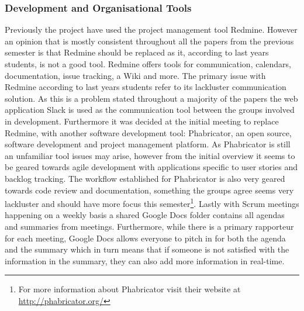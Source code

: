 \subsubsection*{Development and Organisational Tools}
Previously the project have used the project management tool Redmine.
However an opinion that is mostly consistent throughout all the papers from the previous semester is that Redmine should be replaced as it, according to last years students, is not a good tool.
Redmine offers tools for communication, calendars, documentation, issue tracking, a Wiki and more.
The primary issue with Redmine according to last years students refer to its lackluster communication solution.
As this is a problem stated throughout a majority of the papers the web application Slack is used as the communication tool between the groups involved in development.
Furthermore it was decided at the initial meeting to replace Redmine, with another software development tool: Phabricator, an open source, software development and project management platform. 
As Phabricator is still an unfamiliar tool issues may arise, however from the initial overview it seems to be geared towards agile development with applications specific to user stories and backlog tracking.
The workflow established for Phabricator is also very geared towards code review and documentation, something the groups agree seems very lackluster and should have more focus this semester\footnote{For more information about Phabricator visit their website at \url{http://phabricator.org/}}.
Lastly with Scrum meetings happening on a weekly basis a shared Google Docs folder contains all agendas and summaries from meetings.
Furthermore, while there is a primary rapporteur for each meeting, Google Docs allows everyone to pitch in for both the agenda and the summary which in turn means that if someone is not satisfied with the information in the summary, they can also add more information in real-time.
